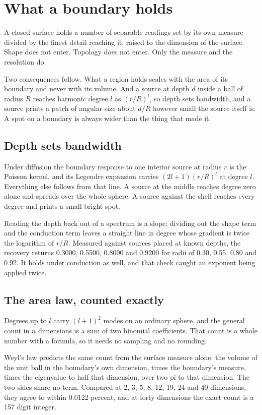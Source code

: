 \chapter{What a boundary holds}

A closed surface holds a number of separable readings set by its own measure divided by the finest detail reaching it, raised to the dimension of the surface. Shape does not enter. Topology does not enter. Only the measure and the resolution do.

Two consequences follow. What a region holds scales with the area of its boundary and never with its volume. And a source at depth $d$ inside a ball of radius $R$ reaches harmonic degree $l$ as $(r/R)^l$, so depth sets bandwidth, and a source prints a patch of angular size about $d/R$ however small the source itself is. A spot on a boundary is always wider than the thing that made it.

\section{Depth sets bandwidth}

Under diffusion the boundary response to one interior source at radius $r$ is the Poisson kernel, and its Legendre expansion carries $(2l+1)(r/R)^l$ at degree $l$. Everything else follows from that line. A source at the middle reaches degree zero alone and spreads over the whole sphere. A source against the shell reaches every degree and prints a small bright spot.

Reading the depth back out of a spectrum is a slope: dividing out the shape term and the conduction term leaves a straight line in degree whose gradient is twice the logarithm of $r/R$. Measured against sources placed at known depths, the recovery returns 0.3000, 0.5500, 0.8000 and 0.9200 for radii of 0.30, 0.55, 0.80 and 0.92. It holds under conduction as well, and that check caught an exponent being applied twice.

\section{The area law, counted exactly}

Degrees up to $l$ carry $(l+1)^2$ modes on an ordinary sphere, and the general count in $n$ dimensions is a sum of two binomial coefficients. That count is a whole number with a formula, so it needs no sampling and no rounding.

Weyl's law predicts the same count from the surface measure alone: the volume of the unit ball in the boundary's own dimension, times the boundary's measure, times the eigenvalue to half that dimension, over two pi to that dimension. The two sides share no term. Compared at 2, 3, 5, 8, 12, 19, 24 and 40 dimensions, they agree to within 0.0122 percent, and at forty dimensions the exact count is a 157 digit integer.

